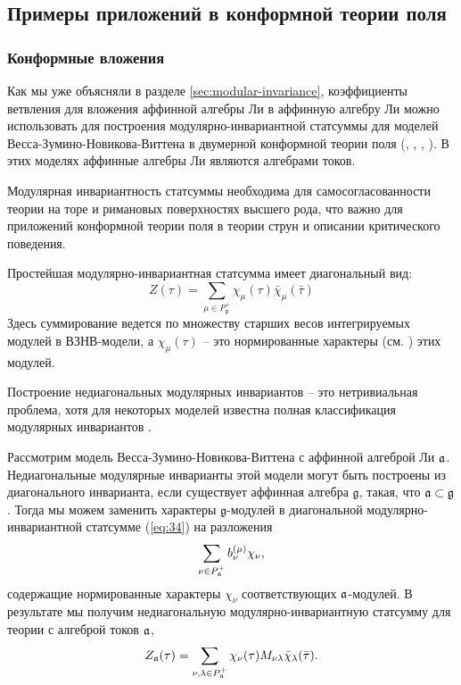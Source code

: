 \subsection{Примеры приложений в конформной теории поля}
\label{sec:phys-appl}

\subsubsection{Конформные вложения}
\label{sec:conformal-embeddings}

Как мы уже объясняли в разделе \ref{sec:modular-invariance}, коэффициенты ветвления для вложения аффинной алгебры Ли в аффинную алгебру Ли можно использовать для построения модулярно-инвариантной статсуммы для моделей Весса-Зумино-Новикова-Виттена в двумерной конформной теории поля (\cite{difrancesco1997cft}, \cite{Walton:1999xc}, \cite{walton1989conformal}, \cite{schellekens1986conformal}).
В этих моделях аффинные алгебры Ли являются алгебрами токов. 

Модулярная инвариантность статсуммы необходима для самосогласованности теории на торе и римановых поверхностях высшего рода, что важно для приложений конформной теории поля в теории струн и описании критического поведения.

Простейшая модулярно-инвариантная статсумма имеет диагональный вид:
\begin{equation}
  \label{eq:34}
   Z(\tau)=\sum_{ \mu\in P^{+}_{\mathfrak{g}}} \chi_{\mu}(\tau)\bar \chi_{\mu}(\bar \tau)
\end{equation}
Здесь суммирование ведется по множеству старших весов интегрируемых модулей в ВЗНВ-модели, а $\chi_{\mu}(\tau)$ -- это нормированные характеры (см. \cite{difrancesco1997cft}) этих модулей.

Построение недиагональных модулярных инвариантов -- это нетривиальная проблема, хотя для некоторых моделей известна полная классификация модулярных инвариантов \cite{1994hepthGannon,1995JMPGannon}.

Рассмотрим модель Весса-Зумино-Новикова-Виттена с аффинной алгеброй Ли $\mathfrak{a}$. Недиагональные модулярные инварианты этой модели могут быть построены из диагонального инварианта, если существует аффинная алгебра  $\mathfrak{g}$, такая, что $\mathfrak{a}\subset\mathfrak{g}$. Тогда мы можем заменить характеры  $\mathfrak{g}$-модулей в диагональной модулярно-инвариантной статсумме (\ref{eq:34}) на разложения
\begin{equation*}
  \label{eq:32}
\sum_{\nu \in P^{+}_{\mathfrak{a}}}b^{(\mu)}_{\nu} \chi_{\nu},
\end{equation*}
содержащие нормированные характеры $\chi_{\nu}$ соответствующих $\mathfrak{a}$-модулей. В результате мы получим недиагональную модулярно-инвариантную статсумму для теории с алгеброй токов $\mathfrak{a}$,
\begin{equation}
  \label{eq:36}
   Z_{\mathfrak{a}}(\tau)=\sum_{ \nu,\lambda\in P^{+}_{\mathfrak{a}}} \chi_{\nu}(\tau)M_{\nu\lambda}\bar \chi_{\lambda}(\bar \tau).
\end{equation}

